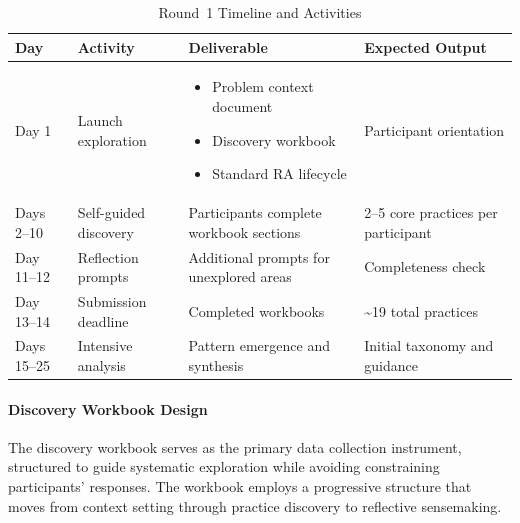 \begin{table}[h]
    \centering
    \caption{Round~1 Timeline and Activities}
    \label{tab:r1-timeline}
    \begin{tabular}{|p{2cm}|p{4cm}|p{4cm}|p{4cm}|}
        \hline
        \textbf{Day}                                                    & \textbf{Activity}       & \textbf{Deliverable}                    & \textbf{Expected Output}           \\
        \hline
        Day 1                                                           & Launch exploration      &
        \begin{itemize}[leftmargin=*,topsep=0pt,itemsep=0pt]
            \item Problem context document
            \item Discovery workbook
            \item Standard RA lifecycle
        \end{itemize} & Participant orientation                                                                                                           \\
        \hline
        Days 2--10                                                       & Self-guided discovery   & Participants complete workbook sections & 2--5 core practices per participant \\
        \hline
        Day 11--12                                                       & Reflection prompts      & Additional prompts for unexplored areas & Completeness check                 \\
        \hline
        Day 13--14                                                       & Submission deadline     & Completed workbooks                     & \textasciitilde19 total practices  \\
        \hline
        Days 15--25                                                      & Intensive analysis      & Pattern emergence and synthesis         & Initial taxonomy and guidance \\
        \hline
    \end{tabular}
\end{table}

\paragraph{Discovery Workbook Design}

The discovery workbook serves as the primary data collection instrument,
structured to guide systematic exploration while avoiding constraining
participants' responses. The workbook employs a progressive structure that
moves from context setting through practice discovery to reflective
sensemaking.

